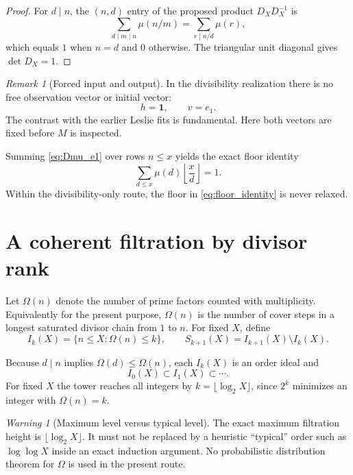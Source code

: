 \documentclass[11pt]{amsart}
\numberwithin{equation}{section}
\theoremstyle{plain}
\theoremstyle{definition}
\theoremstyle{remark}
\newtheorem{remark}[theorem]{Remark}
\newtheorem{warning}[theorem]{Warning}
\begin{document}
\begin{proof}
For $d\mid n$, the $(n,d)$ entry of the proposed product
$D_XD_X^{-1}$ is
\[
\sum_{d\mid m\mid n}\mu(n/m)
=
\sum_{r\mid n/d}\mu(r),
\]
which equals $1$ when $n=d$ and $0$ otherwise.  The triangular unit diagonal gives
$\det D_X=1$.
\end{proof}

\begin{remark}[Forced input and output]
\label{rem:forced_h_v}
In the divisibility realization there is no free observation vector or initial vector:
\[
\boxed{h=\mathbf 1,\qquad v=e_1.}
\]
The contrast with the earlier Leslie fits is fundamental.  Here both vectors are fixed before
$M$ is inspected.
\end{remark}

Summing \eqref{eq:Dmu_e1} over rows $n\le x$ yields the exact floor identity
\begin{equation}
\sum_{d\le x}\mu(d)
\left\lfloor\frac xd\right\rfloor
=1.
\label{eq:floor_identity}
\end{equation}
Within the divisibility-only route, the floor in \eqref{eq:floor_identity} is never relaxed.


\section{A coherent filtration by divisor rank}
\label{sec:omega_filtration}

Let $\Omega(n)$ denote the number of prime factors counted with multiplicity.  Equivalently for
the present purpose, $\Omega(n)$ is the number of cover steps in a longest saturated divisor
chain from $1$ to $n$.  For fixed $X$, define
\begin{equation}
I_k(X)=
\{n\le X:\Omega(n)\le k\},
\qquad
S_{k+1}(X)=I_{k+1}(X)\setminus I_k(X).
\label{eq:Ik_Sk}
\end{equation}

Because $d\mid n$ implies $\Omega(d)\le\Omega(n)$, each $I_k(X)$ is an order ideal and
\[
I_0(X)\subset I_1(X)\subset\cdots.
\]
For fixed $X$ the tower reaches all integers by
$k=\lfloor\log_2X\rfloor$, since $2^k$ minimizes an integer with $\Omega(n)=k$.

\begin{warning}[Maximum level versus typical level]
\label{warn:omega_max_typical}
The exact maximum filtration height is $\lfloor\log_2X\rfloor$.  It must not be replaced by a
heuristic ``typical'' order such as $\log\log X$ inside an exact induction argument.  No
probabilistic distribution theorem for $\Omega$ is used in the present route.
\end{warning}
\end{document}
